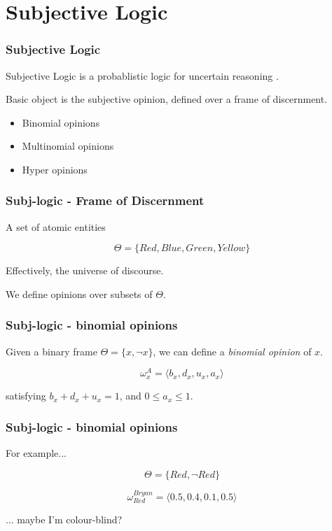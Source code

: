 \documentclass{beamer}
\begin{document}
\section{Subjective Logic}

\begin{frame}
\frametitle{Subjective Logic}

Subjective Logic is a probablistic logic for uncertain reasoning
\cite{josang_logic_2001}.

Basic object is the subjective opinion, defined over a frame of discernment.

\begin{itemize}
  \item Binomial opinions
  \item Multinomial opinions
  \item Hyper opinions \cite{josang2012interpretation}
\end{itemize}

\end{frame}

\begin{frame}
\frametitle{Subj-logic - Frame of Discernment}

A set of atomic entities

$$\Theta = \lbrace Red, Blue, Green, Yellow \rbrace$$

Effectively, the universe of discourse.

We define opinions over subsets of $\Theta$.

\end{frame}

\begin{frame}
\frametitle{Subj-logic - binomial opinions}

Given a binary frame $\Theta = \lbrace x, \lnot x \rbrace$, we can define a
\emph{binomial opinion} of $x$.

$$\omega_{x}^A = \langle b_x, d_x, u_x, a_x \rangle$$

satisfying $b_x + d_x + u_x = 1$, and $0 \leq a_x \leq 1$.

\end{frame}

\begin{frame}
\frametitle{Subj-logic - binomial opinions}

For example...

$$\Theta = \lbrace Red, \lnot Red \rbrace$$

$$\omega_{Red}^{Bryan} = \langle 0.5, 0.4, 0.1, 0.5 \rangle$$

... maybe I'm colour-blind?

\end{frame}
\end{document}
